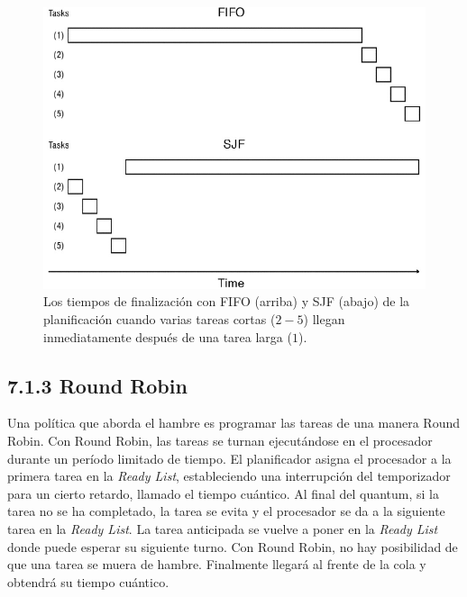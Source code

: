 \documentclass[10pt]{book}
\begin{document}
\begin{figure}[tbhp]
\centerline{\includegraphics[scale=0.70]{img/fig0701}}
\caption{Los tiempos de finalización con FIFO (arriba) y SJF (abajo) de la planificación cuando varias tareas cortas ($2-5$) llegan inmediatamente después de una tarea larga ($1$).}
\label{fig0701}
\end{figure}

\subsection{7.1.3 Round Robin}
Una política que aborda el hambre es programar las tareas de una manera Round Robin. Con Round Robin, las tareas se turnan ejecutándose en el procesador durante un período limitado de tiempo. El planificador asigna el procesador a la primera tarea en la \textit{Ready List}, estableciendo una interrupción del temporizador para un cierto retardo, llamado el tiempo cuántico. Al final del quantum, si la tarea no se ha completado, la tarea se evita y el procesador se da a la siguiente tarea en la \textit{Ready List}. La tarea anticipada se vuelve a poner en la \textit{Ready List} donde puede esperar su siguiente turno. Con Round Robin, no hay posibilidad de que una tarea se muera de hambre. Finalmente llegará al frente de la cola y obtendrá su tiempo cuántico.
\end{document}
